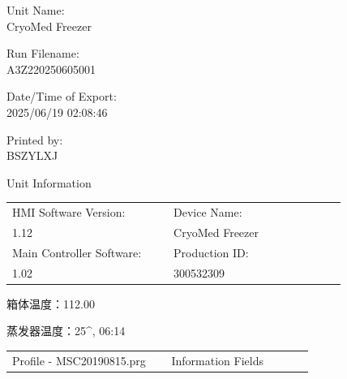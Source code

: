 \documentclass[UTF8,10pt,a4paper,fontset=fandol]{ctexart}
\newcommand{\fieldvalue}[1]{#1}
\newcommand{\handwritten}[1]{#1}
\begin{document}
\begin{flushleft}
\small
Unit Name: \\
\fieldvalue{CryoMed Freezer}

Run Filename: \\
\fieldvalue{A3Z220250605001}

Date/Time of Export: \\
\fieldvalue{2025/06/19 02:08:46}

Printed by: \\
\fieldvalue{BSZYLXJ}

Unit Information

\begin{tabular}{@{}p{0.42\linewidth}p{0.45\linewidth}@{}}
HMI Software Version: &
Device Name: \\
\fieldvalue{1.12} &
\fieldvalue{CryoMed Freezer} \\[2pt]

Main Controller Software: &
Production ID: \\
\fieldvalue{1.02} &
\fieldvalue{300532309}
\end{tabular}

\handwritten{箱体温度：112.00}

\handwritten{蒸发器温度：25^\circ, 06:14}

\vspace{4pt}

\noindent
{}

\begin{tabular}{@{}p{0.48\linewidth}p{0.43\linewidth}@{}}
\centering Profile - MSC20190815.prg &
\centering Information Fields
\end{tabular}


\end{flushleft}
\end{document}
